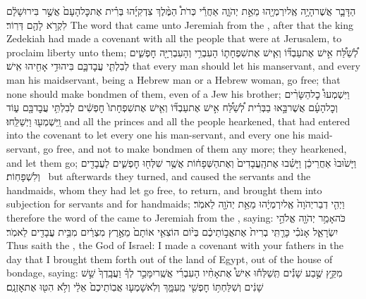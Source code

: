 \setcounter{chap}{34}
\setcounter{verse}{8}
{הַדָּבָ֛ר אֲשֶׁר\maqqaf הָיָ֥ה אֶֽל\maqqaf יִרְמְיָ֖הוּ מֵאֵ֣ת יְהֹוָ֑ה אַחֲרֵ֡י כְּרֹת֩ הַמֶּ֨לֶךְ צִדְקִיָּ֜הוּ בְּרִ֗ית אֶת\maqqaf כׇּל\maqqaf הָעָם֙ אֲשֶׁ֣ר בִּירוּשָׁלַ֔͏ִם לִקְרֹ֥א לָהֶ֖ם דְּרֽוֹר׃}
{The word that came unto Jeremiah from the \lord, after that the king Zedekiah had made a covenant with all the people that were at Jerusalem, to proclaim liberty unto them;}
{לְ֠שַׁלַּ֠ח אִ֣ישׁ אֶת\maqqaf עַבְדּ֞וֹ וְאִ֧ישׁ אֶת\maqqaf שִׁפְחָת֛וֹ הָעִבְרִ֥י וְהָעִבְרִיָּ֖ה חׇפְשִׁ֑ים לְבִלְתִּ֧י עֲבׇד\maqqaf בָּ֛ם בִּיהוּדִ֥י אָחִ֖יהוּ אִֽישׁ׃}
{that every man should let his manservant, and every man his maidservant, being a Hebrew man or a Hebrew woman, go free; that none should make bondmen of them, even of a Jew his brother;}
{וַיִּשְׁמְעוּ֩ כׇל\maqqaf הַשָּׂרִ֨ים וְכׇל\maqqaf הָעָ֜ם אֲשֶׁר\maqqaf בָּ֣אוּ בַבְּרִ֗ית לְ֠שַׁלַּ֠ח אִ֣ישׁ אֶת\maqqaf עַבְדּ֞וֹ וְאִ֤ישׁ אֶת\maqqaf שִׁפְחָתוֹ֙ חׇפְשִׁ֔ים לְבִלְתִּ֥י עֲבׇד\maqqaf בָּ֖ם ע֑וֹד וַֽיִּשְׁמְע֖וּ וַיְשַׁלֵּֽחוּ׃}
{and all the princes and all the people hearkened, that had entered into the covenant to let every one his man-servant, and every one his maid-servant, go free, and not to make bondmen of them any more; they hearkened, and let them go;}
{וַיָּשׁ֙וּבוּ֙ אַחֲרֵי\maqqaf כֵ֔ן וַיָּשִׁ֗בוּ אֶת\maqqaf הָֽעֲבָדִים֙ וְאֶת\maqqaf הַשְּׁפָח֔וֹת אֲשֶׁ֥ר שִׁלְּח֖וּ חׇפְשִׁ֑ים  לַעֲבָדִ֖ים וְלִשְׁפָחֽוֹת׃ \petucha }
{but afterwards they turned, and caused the servants and the handmaids, whom they had let go free, to return, and brought them into subjection for servants and for handmaids;}
{וַיְהִ֤י דְבַר\maqqaf יְהֹוָה֙ אֶֽל\maqqaf יִרְמְיָ֔הוּ מֵאֵ֥ת יְהֹוָ֖ה לֵאמֹֽר׃}
{therefore the word of the \lord\space came to Jeremiah from the \lord, saying:}
{כֹּה\maqqaf אָמַ֥ר יְהֹוָ֖ה אֱלֹהֵ֣י יִשְׂרָאֵ֑ל אָנֹכִ֗י כָּרַ֤תִּֽי בְרִית֙ אֶת\maqqaf אֲב֣וֹתֵיכֶ֔ם בְּי֨וֹם הוֹצִאִ֤י אוֹתָם֙ מֵאֶ֣רֶץ מִצְרַ֔יִם מִבֵּ֥ית עֲבָדִ֖ים לֵאמֹֽר׃}
{Thus saith the \lord, the God of Israel: I made a covenant with your fathers in the day that I brought them forth out of the land of Egypt, out of the house of bondage, saying:}
{מִקֵּ֣ץ שֶׁ֣בַע שָׁנִ֡ים תְּֽשַׁלְּח֡וּ אִישׁ֩ אֶת\maqqaf אָחִ֨יו הָעִבְרִ֜י אֲשֶֽׁר\maqqaf יִמָּכֵ֣ר לְךָ֗ וַעֲבָֽדְךָ֙ שֵׁ֣שׁ שָׁנִ֔ים וְשִׁלַּחְתּ֥וֹ חׇפְשִׁ֖י מֵֽעִמָּ֑ךְ וְלֹֽא\maqqaf שָׁמְע֤וּ אֲבֽוֹתֵיכֶם֙ אֵלַ֔י וְלֹ֥א הִטּ֖וּ אֶת\maqqaf אׇזְנָֽם׃}
